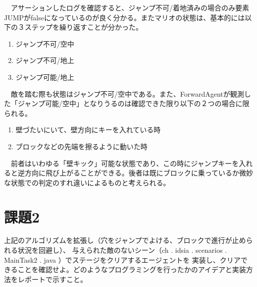 \documentclass[a4j]{jarticle}
\begin{document}
\begin{description}
　アサーションしたログを確認すると、ジャンプ不可/着地済みの場合のみ要素JUMPがfalseになっているのが良く分かる。またマリオの状態は、基本的には以下の３ステップを繰り返すことが分かった。
\begin{enumerate}
 \item ジャンプ不可/空中
 \item ジャンプ不可/地上
 \item ジャンプ可能/地上
\end{enumerate}
　敵を踏む際も状態はジャンプ不可/空中である。また、ForwardAgentが観測した「ジャンプ可能/空中」となりうるのは確認できた限り以下の２つの場合に限られる。
\begin{enumerate}
 \item 壁づたいにいて、壁方向にキーを入れている時
 \item ブロックなどの先端を擦るように動いた時
\end{enumerate}
　前者はいわゆる「壁キック」可能な状態であり、この時にジャンプキーを入れると逆方向に飛び上がることができる。後者は既にブロックに乗っているか微妙な状態での判定のすれ違いによるものと考えられる。
\end{description}

\newpage

\section{課題2}
  上記のアルゴリズムを拡張し（穴をジャンプでよける、ブロックで進行が止められる状況を回避し）、
与えられた敵のないシーン（ch . idsia . scenarios . MainTask2 . java ）でステージをクリアするエージェントを
実装し、クリアできることを確認せよ。どのようなプログラミングを行ったかのアイデアと実装方法をレポートで示すこと。
\end{document}
